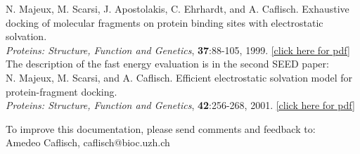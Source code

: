 \documentclass[a4paper,12pt,titlepage]{article}
\begin{document}
{\small
\noindent
N. Majeux, M. Scarsi, J. Apostolakis, C. Ehrhardt, and A. Caflisch.
Exhaustive docking of molecular fragments on protein binding sites 
with electrostatic solvation. \\
{\it Proteins: Structure, Function and Genetics}, 
{\bf 37}:88-105, 1999. \hspace*{1cm}
}
\href{http://www.biochem-caflisch.uzh.ch/static/pdf/majeux99.pdf}{[click here for pdf]}
%
\\[4mm]
The description of the fast energy evaluation is in the second SEED paper: \\
{\small
\noindent
N. Majeux, M. Scarsi, and A. Caflisch.
Efficient electrostatic solvation model for protein-fragment docking. \\
{\it Proteins: Structure, Function and Genetics}, 
{\bf 42}:256-268, 2001. \hspace*{1cm}
}
\href{http://www.biochem-caflisch.uzh.ch/static/pdf/majeux01.pdf}{[click here for pdf]}



\vspace{0.5cm}


\noindent
To improve this documentation, please send comments and feedback to: \\[-1mm]
Amedeo Caflisch,  %
caflisch@bioc.uzh.ch \\


\linespread{1.5}

\newpage

\setcounter{page}{1}

\tableofcontents
\end{document}
